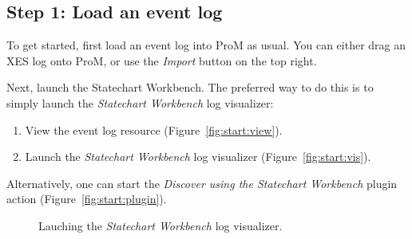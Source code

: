 \documentclass{article}
\begin{document}
\subsection{Step 1: Load an event log}
To get started, first load an event log into ProM as usual.
You can either drag an XES log onto ProM, or use the \emph{Import} button on 
the top right.

Next, launch the Statechart Workbench.
The preferred way to do this is to simply launch the \emph{Statechart Workbench} log visualizer:
\begin{enumerate}
  \item View the event log resource (Figure~\ref{fig:start:view}).
  \item Launch the \emph{Statechart Workbench} log visualizer (Figure~\ref{fig:start:vis}).
\end{enumerate}
Alternatively, one can start the \emph{Discover using the Statechart Workbench} plugin action (Figure~\ref{fig:start:plugin}).

\begin{figure}[hb!]
\centering
\vspace*{-0.5em}
\vspace*{-1em}
\caption{Lauching the \emph{Statechart Workbench} log visualizer.}
\label{fig:start}
\vspace*{-0.5em}
\end{figure}
\end{document}
